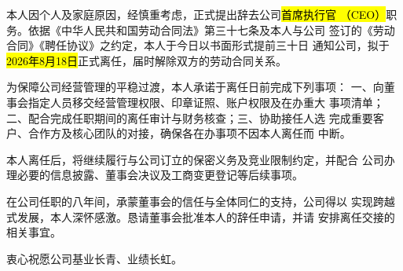\documentclass[zihao=-4]{ctexart}
\begin{document}


本人因个人及家庭原因，经慎重考虑，正式提出辞去公司\hl{首席执行官
（CEO）}职务。依据《中华人民共和国劳动合同法》第三十七条及本人与公司
签订的《劳动合同》《聘任协议》之约定，本人于今日以书面形式提前三十日
通知公司，拟于\hl{2026年8月18日}正式离任，届时解除双方的劳动合同关系。

为保障公司经营管理的平稳过渡，本人承诺于离任日前完成下列事项：
一、向董事会指定人员移交经营管理权限、印章证照、账户权限及在办重大
事项清单；二、配合完成任职期间的离任审计与财务核查；三、协助接任人选
完成重要客户、合作方及核心团队的对接，确保各在办事项不因本人离任而
中断。

本人离任后，将继续履行与公司订立的保密义务及竞业限制约定，并配合
公司办理必要的信息披露、董事会决议及工商变更登记等后续事项。

在公司任职的八年间，承蒙董事会的信任与全体同仁的支持，公司得以
实现跨越式发展，本人深怀感激。恳请董事会批准本人的辞任申请，并请
安排离任交接的相关事宜。

衷心祝愿公司基业长青、业绩长虹。

\ltClosing

\end{document}
